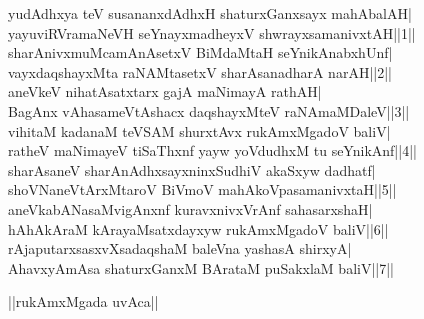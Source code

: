 \documentclass{article}
\begin{document}
yudAdhxya teV susananxdAdhxH shaturxGanxsayx mahAbalAH|\\
yayuviRVramaNeVH seYnayxmadheyxV shwrayxsamanivxtAH||1||\\
sharAnivxmuMcamAnAsetxV BiMdaMtaH seYnikAnabxhUnf|\\
vayxdaqshayxMta raNAMtasetxV sharAsanadharA narAH||2||\\
aneVkeV nihatAsatxtarx gajA maNimayA rathAH|\\
BagAnx vAhasameVtAshacx daqshayxMteV raNAmaMDaleV||3||\\
vihitaM kadanaM teVSAM shurxtAvx rukAmxMgadoV baliV|\\
ratheV maNimayeV tiSaThxnf yayw yoVdudhxM tu seYnikAnf||4||\\
sharAsaneV sharAnAdhxsayxninxSudhiV akaSxyw dadhatf|\\
shoVNaneVtArxMtaroV BiVmoV mahAkoVpasamanivxtaH||5||\\
aneVkabANasaMvigAnxnf kuravxnivxVrAnf sahasarxshaH|\\
hAhAkAraM kArayaMsatxdayxyw rukAmxMgadoV baliV||6||\\
rAjaputarxsasxvXsadaqshaM baleVna yashasA shirxyA|\\
AhavxyAmAsa shaturxGanxM BArataM puSakxlaM baliV||7||\\

\begin{center}
||rukAmxMgada uvAca||
\end{center}
\end{document}
